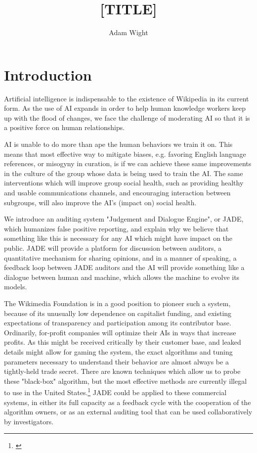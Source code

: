\documentclass[format=sigconf, authorversion]{acmart}
\title{[TITLE]}
\author{Adam Wight}
\affiliation{Wikimedia Foundation}
\begin{document}
\maketitle

\section{Introduction}

Artificial intelligence is indispensable to the existence of Wikipedia in its current form.  As the use of AI expands in order to help human knowledge workers keep up with the flood of changes, we face the challenge of moderating AI so that it is a positive force on human relationships.

AI is unable to do more than ape the human behaviors we train it on.  This means that most effective way to mitigate biases, e.g. favoring English language references, or misogyny in curation, is if we can achieve these same improvements in the culture of the group whose data is being used to train the AI.  The same interventions which will improve group social health, such as providing healthy and usable communications channels, and encouraging interaction between subgroups, will also improve the AI's (impact on) social health.

We introduce an auditing system "Judgement and Dialogue Engine", or JADE, which humanizes false positive reporting, and explain why we believe that something like this is necessary for any AI which might have impact on the public.  JADE will provide a platform for discussion between auditors, a quantitative mechanism for sharing opinions, and in a manner of speaking, a feedback loop between JADE auditors and the AI will provide something like a dialogue between human and machine, which allows the machine to evolve its models.

The Wikimedia Foundation is in a good position to pioneer such a system, because of its unusually low dependence on capitalist funding, and existing expectations of transparency and participation among its contributor base.  Ordinarily, for-profit companies will optimize their AIs in ways that increase profits.  As this might be received critically by their customer base, and leaked details might allow for gaming the system, the exact algorithms and tuning parameters necessary to understand their behavior are almost always be a tightly-held trade secret.  There are known techniques which allow us to probe these "black-box" algorithm, but the most effective methods are currently illegal to use in the United States.\footnote{\citep{Sandvig}}  JADE could be applied to these commercial systems, in either its full capacity as a feedback cycle with the cooperation of the algorithm owners, or as an external auditing tool that can be used collaboratively by investigators.
\end{document}
